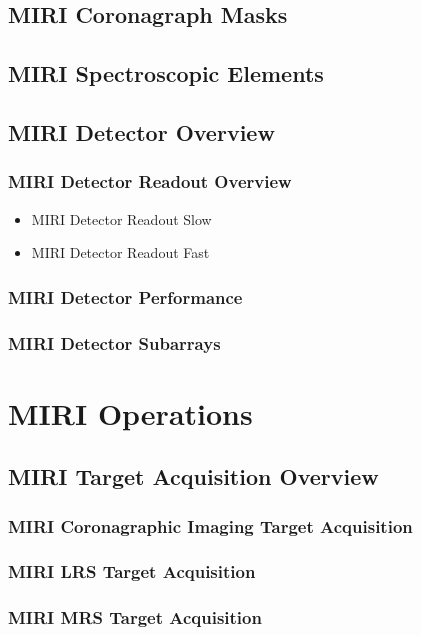     \subsection{MIRI Coronagraph Masks}
    \subsection{MIRI Spectroscopic Elements}
    \subsection{MIRI Detector Overview}
        \subsubsection{MIRI Detector Readout Overview}
          \begin{itemize}
            \item{MIRI Detector Readout Slow}
            \item{MIRI Detector Readout Fast}
          \end{itemize}
         \subsubsection{MIRI Detector Performance}
         \subsubsection{MIRI Detector Subarrays}


\section{MIRI Operations}
\subsection{MIRI Target Acquisition Overview}
\subsubsection{MIRI Coronagraphic Imaging Target Acquisition}
\subsubsection{MIRI LRS Target Acquisition}
\subsubsection{MIRI MRS Target Acquisition}
